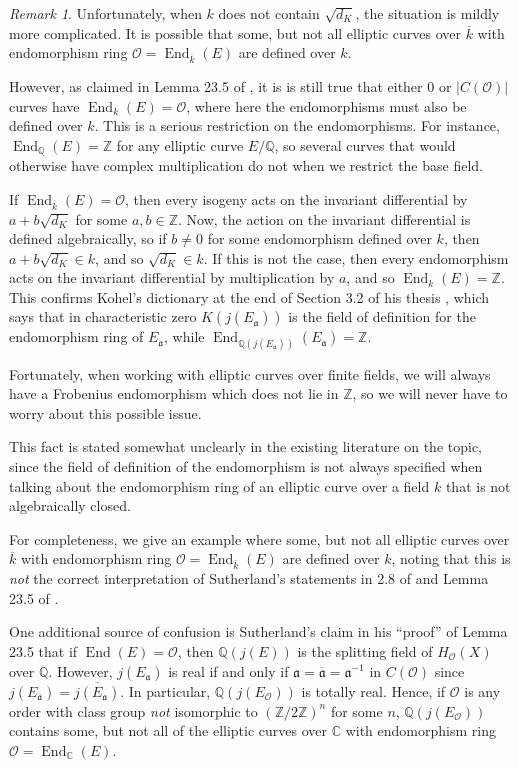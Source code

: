 \documentclass{amsart}
\theoremstyle{definition}
\theoremstyle{remark}
\newtheorem{remark}[thm]{Remark}
\numberwithin{equation}{section}
\newcommand{\cO}{\mathcal O}
\newcommand{\fka}{\mathfrak a}
\newcommand{\bbC}{\mathbb C}
\newcommand{\bbQ}{\mathbb Q}
\newcommand{\bbZ}{\mathbb Z}
\newcommand{\inv}{^{-1}}
\DeclareMathOperator{\End}{End}
\begin{document}
 \begin{remark}
 Unfortunately, when $k$ does not contain $\sqrt{d_{K}}$, the situation is mildly more complicated. It is possible that some, but not all elliptic curves over $\overline{k}$ with endomorphism ring $\cO = \End_{\overline{k}}(E)$ are defined over $k$. 
 
 However, as claimed in Lemma 23.5 of \cite{SutherlandLN}, it is is still true that either $0$ or $|C(\cO)|$ curves have $\End_{k}(E) = \cO$, where here the endomorphisms must also be defined over $k$. This is a serious restriction on the endomorphisms. For instance, $\End_{\bbQ}(E) = \bbZ$ for any elliptic curve $E/\bbQ$, so several curves that would otherwise have complex multiplication do not when we restrict the base field.
 
 If $\End_{\overline{k}}(E) = \cO$, then every isogeny acts on the invariant differential by $a + b \sqrt{d_{K}}$ for some $a, b \in \bbZ$. Now, the action on the invariant differential is defined algebraically, so if $b \neq 0$ for some endomorphism defined over $k$, then $a + b \sqrt{d_{K}} \in k$, and so $\sqrt{d_{K}} \in k$. If this is not the case, then every endomorphism acts on the invariant differential by multiplication by $a$, and so $\End_{k}(E) = \bbZ$. 
This confirms Kohel's dictionary at the end of Section 3.2 of his thesis \cite{KohelThesis}, which says that in characteristic zero $K(j(E_{\fka}))$ is the field of definition for the endomorphism ring of $E_{\fka}$, while $\End_{\bbQ(j(E_{\fka}))}(E_{\fka}) = \bbZ$.
  
 Fortunately, when working with elliptic curves over finite fields, we will always have a Frobenius endomorphism which does not lie in $\bbZ$, so we will never have to worry about this possible issue.  
 
 This fact is stated somewhat unclearly in the existing literature on the topic, since the field of definition of the endomorphism is not always specified when talking about the endomorphism ring of an elliptic curve over a field $k$ that is not algebraically closed. 
 
 For completeness, we give an example where some, but not all elliptic curves over $\overline{k}$ with endomorphism ring $\cO = \End_{\overline{k}}(E)$ are defined over $k$, noting that this is \emph{not} the correct interpretation of Sutherland's statements in 2.8 of \cite{SutherlandIV} and Lemma 23.5 of \cite{SutherlandLN}. 
 
 One additional source of confusion is Sutherland's claim in his ``proof'' of Lemma 23.5 that if $\End(E) = \cO$, then $\bbQ(j(E))$ is the splitting field of $H_{\cO}(X)$ over $\bbQ$. However, $j(E_{\fka})$ is real if and only if $\fka = \overline{\fka} = \fka\inv$ in $C(\cO)$ since $j(E_{\overline{\fka}}) = \overline{j(E_{\fka})}$. In particular, $\bbQ(j(E_{\cO}))$ is totally real. Hence, if $\cO$ is any order with class group \emph{not} isomorphic to $(\bbZ/2\bbZ)^n$ for some $n$, $\bbQ(j(E_{\cO}))$ contains some, but not all of the elliptic curves over $\bbC$ with endomorphism ring $\cO = \End_{\bbC}(E)$.
 

\end{remark}
\end{document}
